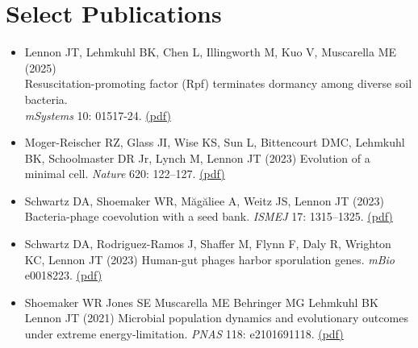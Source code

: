 \documentclass[11pt]{article}  %
\begin{document}
\section*{Select Publications}
\vspace{-0.05em}
\begin{itemize}[leftmargin=*, label={}, itemsep=1em]

\item Lennon JT, Lehmkuhl BK, Chen L, Illingworth M, Kuo V, Muscarella ME (2025) \\Resuscitation-promoting factor (Rpf) terminates dormancy among diverse soil bacteria.\\
\textit{mSystems} 10: 01517-24. \href{https://lennonlab.github.io/assets/publications/Lennon_etal_2025b.pdf}{(pdf)}

\item Moger-Reischer RZ, Glass JI, Wise KS, Sun L, Bittencourt DMC, Lehmkuhl BK, Schoolmaster DR Jr, Lynch M, Lennon JT (2023) Evolution of a minimal cell. \textit{Nature} 620: 122--127. \href{https://lennonlab.github.io/assets/publications/Moger-Reischer_etal_2023.pdf}{(pdf)}

\item Schwartz DA, Shoemaker WR, Măgăliee A, Weitz JS, Lennon JT (2023) Bacteria-phage coevolution with a seed bank. \textit{ISMEJ} 17: 1315–1325. \href{https://lennonlab.github.io/assets/publications/Schwartz_etal_2023b.pdf}{(pdf)}

\item Schwartz DA, Rodriguez-Ramos J, Shaffer M, Flynn F, Daly R, Wrighton KC, Lennon JT (2023) Human-gut phages harbor sporulation genes. \textit{mBio} e0018223. \href{https://lennonlab.github.io/assets/publications/Schwartz_etal_2023a.pdf}{(pdf)}


\item Shoemaker WR Jones SE Muscarella ME Behringer MG Lehmkuhl BK Lennon JT (2021) Microbial population dynamics and evolutionary outcomes under extreme energy-limitation. \textit{PNAS} 118: e2101691118. \href{https://lennonlab.github.io/assets/publications/Shoemaker_etal_2021b.pdf}{(pdf)}


\end{itemize}
\end{document}
